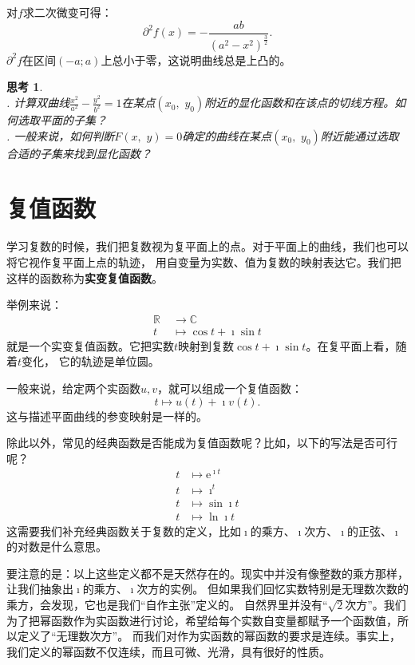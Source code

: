 \documentclass[12pt,UTF8]{ctexbook}
\newcommand{\e}{\mathrm{e}}
\theoremstyle{definition}
\theoremstyle{plain}
\newtheorem{sk}{思考}[section]
\begin{document}
对$f$求二次微变可得：
$$ \partial^2 f(x) = -\frac{ab}{(a^2 - x^2)^{\frac{3}{2}} }.$$
$\partial^2 f$在区间$(-a;a)$上总小于零，这说明曲线总是上凸的。

\begin{sk}
    \mbox{} \\
    . 计算双曲线$\frac{x^2}{a^2} - \frac{y^2}{b^2} = 1$在某点$(x_0,\,\,y_0)$附近的显化函数和在该点的切线方程。如何选取平面的子集？\\
    . 一般来说，如何判断$F(x,\,\, y) = 0$确定的曲线在某点$(x_0,\,\,y_0)$附近能通过选取合适的子集来找到显化函数？
\end{sk}

\section{复值函数}

学习复数的时候，我们把复数视为复平面上的点。对于平面上的曲线，我们也可以将它视作复平面上点的轨迹，
用自变量为实数、值为复数的映射表达它。我们把这样的函数称为\textbf{实变复值函数}。

举例来说：
\begin{align*}
    \mathbb{R} \;&\rightarrow \mathbb{C} \\
    t \;&\mapsto \cos{t} + \imath \sin{t}
\end{align*}
就是一个实变复值函数。它把实数$t$映射到复数$\cos{t} + \imath \sin{t}$。在复平面上看，随着$t$变化，
它的轨迹是单位圆。

一般来说，给定两个实函数$u,v$，就可以组成一个复值函数：
$$ t\mapsto u(t) + \imath v(t).$$
这与描述平面曲线的参变映射是一样的。

除此以外，常见的经典函数是否能成为复值函数呢？比如，以下的写法是否可行呢？
\begin{align*}
    t &\mapsto \e^{\imath t} \\
    t &\mapsto \imath^t \\
    t &\mapsto \sin{\imath t} \\
    t &\mapsto \ln{\imath t} 
\end{align*}
这需要我们补充经典函数关于复数的定义，比如$\imath$的乘方、$\imath$次方、$\imath$的正弦、$\imath$的对数是什么意思。

要注意的是：以上这些定义都不是天然存在的。现实中并没有像整数的乘方那样，让我们抽象出$\imath$的乘方、$\imath$次方的实例。
但如果我们回忆实数特别是无理数次数的乘方，会发现，它也是我们“自作主张”定义的。
自然界里并没有“$\sqrt{2}$次方”。我们为了把幂函数作为实函数进行讨论，希望给每个实数自变量都赋予一个函数值，所以定义了“无理数次方”。
而我们对作为实函数的幂函数的要求是连续。事实上，我们定义的幂函数不仅连续，而且可微、光滑，具有很好的性质。
\end{document}
